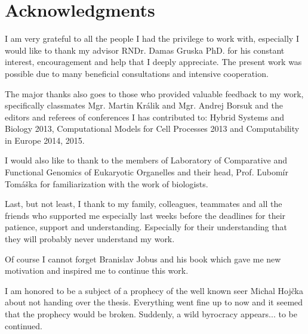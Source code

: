 \chapter*{Acknowledgments}

I am very grateful to all the people I had the privilege to work with, especially I would like to thank my advisor RNDr. Damas Gruska PhD. for his constant interest, encouragement and help that I deeply appreciate.
The present work was possible due to many beneficial consultations and intensive cooperation.

The major thanks also goes to those who provided valuable feedback to my work, specifically classmates Mgr. Martin Králik and Mgr. Andrej Borsuk and the editors and referees of conferences I has contributed to: Hybrid Systems and Biology 2013, Computational Models for Cell Processes 2013 and Computability in Europe 2014, 2015.

I would also like to thank to the members of Laboratory of Comparative and Functional Genomics of Eukaryotic Organelles and their head, Prof. Ľubomír Tomáška for familiarization with the work of biologists.

Last, but not least, I thank to my family, colleagues, teammates and all the friends who supported me especially last weeks before the deadlines for their patience, support and understanding.
\ifdefined\godzilla
  Especially for their understanding that they will probably never understand my work.

  Of course I cannot forget Branislav Jobus and his book \cite{Jobus10Ancijas} which gave me new motivation and inspired me to continue this work.

  I am honored to be a subject of a prophecy of the well known seer Michal Hojčka about not handing over the thesis. Everything went fine up to now and it seemed that the prophecy would be broken. Suddenly, a wild byrocracy appears... to be continued.  
\fi
